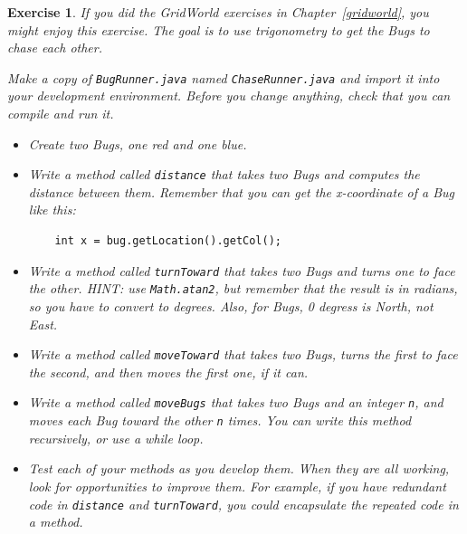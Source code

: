 \documentclass[12pt]{book}
\theoremstyle{exercise}
\newtheorem{exercise}{Exercise}[chapter]
\begin{document}
\begin{exercise}

If you did the GridWorld exercises in Chapter~\ref{gridworld}, you
might enjoy this exercise.  The goal is to use trigonometry to get the
Bugs to chase each other.

Make a copy of {\tt BugRunner.java} named {\tt ChaseRunner.java} and
import it into your development environment.  Before you change
anything, check that you can compile and run it.

\begin{itemize}

\item Create two Bugs, one red and one blue.

\item Write a method called {\tt distance} that takes two Bugs
and computes the distance between them.  Remember that you can
get the x-coordinate of a Bug like this:

\begin{lstlisting}
    int x = bug.getLocation().getCol();
\end{lstlisting}

\item Write a method called {\tt turnToward} that takes two
Bugs and turns one to face the other.  HINT: use {\tt Math.atan2},
but remember that the result is in radians, so you have to
convert to degrees.  Also, for Bugs, 0 degress is North, not East.

\item Write a method called {\tt moveToward} that takes two
Bugs, turns the first to face the second, and then moves the
first one, if it can.

\item Write a method called {\tt moveBugs} that takes two Bugs
and an integer {\tt n}, and moves each Bug toward the other {\tt n}
times.  You can write this method recursively, or use a while loop.

\item Test each of your methods as you develop them.  When they are
  all working, look for opportunities to improve them.  For example,
  if you have redundant code in {\tt distance} and {\tt turnToward},
  you could encapsulate the repeated code in a method.

\end{itemize}

\end{exercise}
\end{document}

